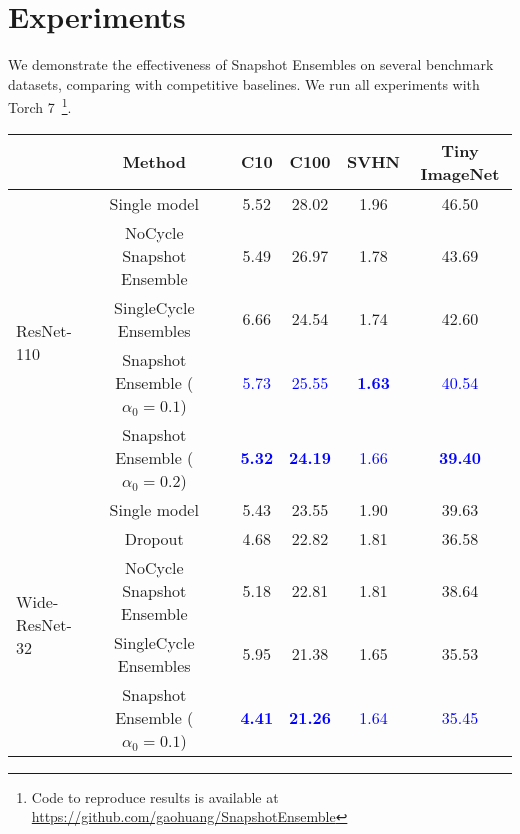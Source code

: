 \section{Experiments}
\label{sec:results}



We demonstrate the effectiveness of Snapshot Ensembles on several benchmark datasets, comparing with competitive baselines. We run all experiments with Torch 7~\citep{torch}\footnote{Code to reproduce results is available at \url{https://github.com/gaohuang/SnapshotEnsemble}}.


\begin{table*}[t]
\centering
\small
\begin{tabular}{lcccccc}
\toprule
& {\bf Method} &  & {\bf C10} & {\bf C100} & \bf{SVHN} & \bf{Tiny ImageNet}\\
\midrule
\multirow{5}{*}{{ ResNet-110}}  &  Single model &  & 5.52 &  28.02 & 1.96 & 46.50\\
&  NoCycle Snapshot Ensemble &  &  5.49 &  26.97 & 1.78 & 43.69 \\
&  SingleCycle Ensembles & & 6.66 & 24.54  & 1.74 & 42.60\\
&  Snapshot Ensemble ($\alpha_0=0.1$) &  &  \textcolor{blue}{5.73} &  \textcolor{blue}{25.55} & \textcolor{blue}{\bf 1.63}  & \textcolor{blue}{40.54} \\
&  Snapshot Ensemble ($\alpha_0=0.2$) &  &  \textcolor{blue}{{\bf 5.32}} &  \textcolor{blue}{{\bf 24.19}} & \textcolor{blue}{1.66} & \textcolor{blue}{\bf 39.40} \\
\midrule
\multirow{6}{*}{{ Wide-ResNet-32}}  &  Single model &  &  5.43  &  23.55  & 1.90 & 39.63 \\
&  Dropout &  & 4.68  &  22.82  & 1.81  & 36.58 \\
&  NoCycle Snapshot Ensemble &  &  5.18 &  22.81 & 1.81 & 38.64\\
&  SingleCycle Ensembles && 5.95 & 21.38  & 1.65  & 35.53\\
&  Snapshot Ensemble ($\alpha_0=0.1$) &  &  \textcolor{blue}{{\bf 4.41}} &  \textcolor{blue}{{\bf 21.26}}  & \textcolor{blue}{1.64} & \textcolor{blue}{35.45}\\

\end{tabular}
\end{table*}
